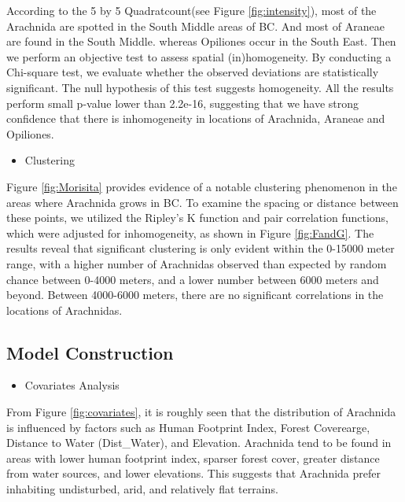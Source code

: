\documentclass{article}
\providecommand{\tightlist}{%
  \setlength{\itemsep}{0pt}\setlength{\parskip}{0pt}}
\begin{document}
According to the 5 by 5 Quadratcount(see Figure \ref{fig:intensity}),
most of the Arachnida are spotted in the South Middle areas of BC. And
most of Araneae are found in the South Middle. whereas Opiliones occur
in the South East. Then we perform an objective test to assess spatial
(in)homogeneity. By conducting a Chi-square test, we evaluate whether
the observed deviations are statistically significant. The null
hypothesis of this test suggests homogeneity. All the results perform
small p-value lower than 2.2e-16, suggesting that we have strong
confidence that there is inhomogeneity in locations of Arachnida,
Araneae and Opiliones.

\begin{itemize}
\tightlist
\item
  Clustering
\end{itemize}

Figure \ref{fig:Morisita} provides evidence of a notable clustering
phenomenon in the areas where Arachnida grows in BC. To examine the
spacing or distance between these points, we utilized the Ripley's K
function and pair correlation functions, which were adjusted for
inhomogeneity, as shown in Figure \ref{fig:FandG}. The results reveal
that significant clustering is only evident within the 0-15000 meter
range, with a higher number of Arachnidas observed than expected by
random chance between 0-4000 meters, and a lower number between 6000
meters and beyond. Between 4000-6000 meters, there are no significant
correlations in the locations of Arachnidas.

\hypertarget{model-construction}{%
\subsection*{Model Construction}\label{model-construction}}

\begin{itemize}
\tightlist
\item
  Covariates Analysis
\end{itemize}

From Figure \ref{fig:covariates}, it is roughly seen that the
distribution of Arachnida is influenced by factors such as Human
Footprint Index, Forest Coverearge, Distance to Water (Dist\_Water), and
Elevation. Arachnida tend to be found in areas with lower human
footprint index, sparser forest cover, greater distance from water
sources, and lower elevations. This suggests that Arachnida prefer
inhabiting undisturbed, arid, and relatively flat terrains.
\end{document}
